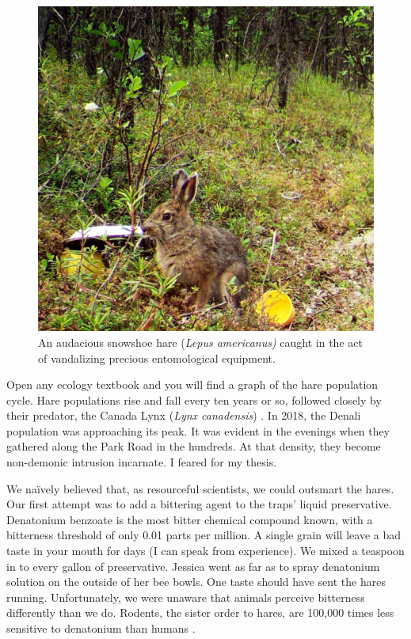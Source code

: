 \begin{figure}[H]
\begin{center}
\vspace{2mm}
\includegraphics[width=\textwidth]{img/hare.jpg}
\caption{An audacious snowshoe hare (\textit{Lepus americanus)} caught in the act of vandalizing precious entomological equipment.}
\label{hare}
\end{center}
\end{figure}  

Open any ecology textbook and you will find a graph of the hare population cycle. Hare populations rise and fall every ten years or so, followed closely by their predator, the Canada Lynx (\textit{Lynx canadensis}) \citep{Krebsetal2001}. In 2018, the Denali population was approaching its peak. It was evident in the evenings when they gathered along the Park Road in the hundreds. At that density, they become non-demonic intrusion incarnate. I feared for my thesis. 

We na\"{i}vely believed that, as resourceful scientists, we could outsmart the hares. Our first attempt was to add a bittering agent to the traps’ liquid preservative. Denatonium benzoate is the most bitter chemical compound known, with a bitterness threshold of only 0.01 parts per million. A single grain will leave a bad taste in your mouth for days (I can speak from experience). We mixed a teaspoon in to every gallon of preservative. Jessica went as far as to spray denatonium solution on the outside of her bee bowls. One taste should have sent the hares running. Unfortunately, we were unaware that animals perceive bitterness differently than we do. Rodents, the sister order to hares, are 100,000 times less sensitive to denatonium than humans \citep{Franketal2004}. 

